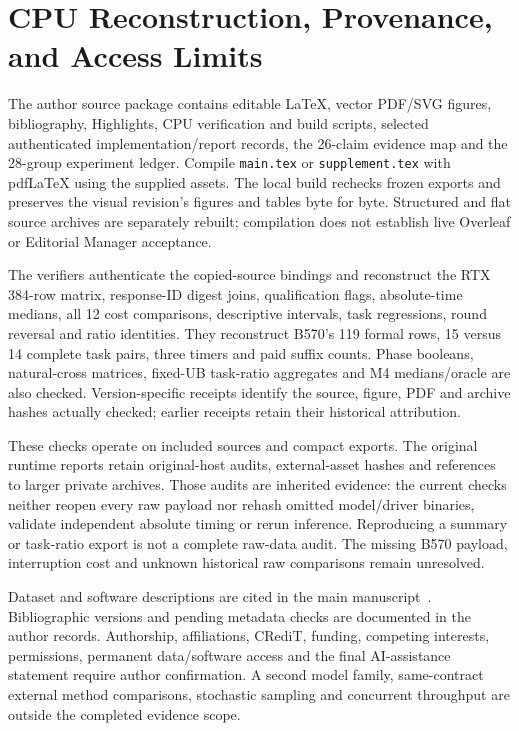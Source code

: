 \section{CPU Reconstruction, Provenance, and Access Limits}
\label{supp:reproducibility}
The author source package contains editable LaTeX, vector PDF/SVG figures, bibliography, Highlights, CPU verification and build scripts, selected authenticated implementation/report records, the 26-claim evidence map and the 28-group experiment ledger. Compile \texttt{main.tex} or \texttt{supplement.tex} with pdfLaTeX using the supplied assets. The local build rechecks frozen exports and preserves the visual revision's figures and tables byte for byte. Structured and flat source archives are separately rebuilt; compilation does not establish live Overleaf or Editorial Manager acceptance.

The verifiers authenticate the copied-source bindings and reconstruct the RTX 384-row matrix, response-ID digest joins, qualification flags, absolute-time medians, all 12 cost comparisons, descriptive intervals, task regressions, round reversal and ratio identities. They reconstruct B570's 119 formal rows, 15 versus 14 complete task pairs, three timers and paid suffix counts. Phase booleans, natural-cross matrices, fixed-UB task-ratio aggregates and M4 medians/oracle are also checked. Version-specific receipts identify the source, figure, PDF and archive hashes actually checked; earlier receipts retain their historical attribution.

These checks operate on included sources and compact exports. The original runtime reports retain original-host audits, external-asset hashes and references to larger private archives. Those audits are inherited evidence: the current checks neither reopen every raw payload nor rehash omitted model/driver binaries, validate independent absolute timing or rerun inference. Reproducing a summary or task-ratio export is not a complete raw-data audit. The missing B570 payload, interruption cost and unknown historical raw comparisons remain unresolved.

Dataset and software descriptions are cited in the main manuscript~\cite{humaneval,mbpp,specbench,llamacpp,qwen3}. Bibliographic versions and pending metadata checks are documented in the author records. Authorship, affiliations, CRediT, funding, competing interests, permissions, permanent data/software access and the final AI-assistance statement require author confirmation. A second model family, same-contract external method comparisons, stochastic sampling and concurrent throughput are outside the completed evidence scope.
